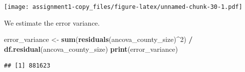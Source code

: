 \documentclass[
]{article}
\newenvironment{Shaded}{\begin{snugshade}}{\end{snugshade}}
\newcommand{\DecValTok}[1]{\textcolor[rgb]{0.00,0.00,0.81}{#1}}
\newcommand{\FunctionTok}[1]{\textcolor[rgb]{0.13,0.29,0.53}{\textbf{#1}}}
\newcommand{\NormalTok}[1]{#1}
\newcommand{\OtherTok}[1]{\textcolor[rgb]{0.56,0.35,0.01}{#1}}
\newcommand{\SpecialCharTok}[1]{\textcolor[rgb]{0.81,0.36,0.00}{\textbf{#1}}}
\begin{document}
\texttt{[image: assignment1-copy\_files/figure-latex/unnamed-chunk-30-1.pdf]}

We estimate the error variance.

\begin{Shaded}
\begin{Highlighting}[]
\NormalTok{error\_variance }\OtherTok{\textless{}{-}} \FunctionTok{sum}\NormalTok{(}\FunctionTok{residuals}\NormalTok{(ancova\_county\_size)}\SpecialCharTok{\^{}}\DecValTok{2}\NormalTok{) }\SpecialCharTok{/} \FunctionTok{df.residual}\NormalTok{(ancova\_county\_size)}
\FunctionTok{print}\NormalTok{(error\_variance)}
\end{Highlighting}
\end{Shaded}

\begin{verbatim}
## [1] 881623
\end{verbatim}
\end{document}
